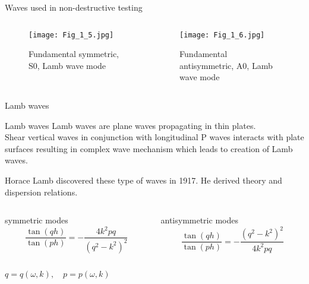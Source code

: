 \documentclass[10pt,aspectratio=169]{beamer} %
\begin{document}
\begin{frame}{Waves used in non-destructive testing}
\begin{columns}[T]
	\begin{column}{0.5\textwidth}
		\begin{figure}
		\texttt{[image: Fig\_1\_5.jpg]}
		\caption{Fundamental symmetric, S0, \alert{Lamb wave} mode }	
		\end{figure}
	\end{column}
	\begin{column}{0.5\textwidth}
		\begin{figure}
		\texttt{[image: Fig\_1\_6.jpg]}
		\caption{Fundamental antisymmetric, A0, \alert{Lamb wave} mode }
		\end{figure}
	\end{column}
\end{columns}	
\end{frame}
\note{
	
}
\begin{frame}{Lamb waves}
\begin{alertblock}{Lamb waves}	
		Lamb waves are plane waves propagating in thin plates.\\
		Shear vertical waves in conjunction with longitudinal P waves interacts with plate surfaces resulting in complex wave mechanism which leads to creation of Lamb waves.
\end{alertblock}
Horace Lamb discovered these type of waves in 1917.
He derived theory and dispersion relations.
\begin{columns}[T]
	\begin{column}{0.5\textwidth}
		\centering
		symmetric modes
		\begin{equation*}
		  \frac{\tan(q h)}{\tan(p h)} = -\frac{4 k^2 p q}{\left(q^2 - k^2\right)^2}
		\end{equation*}
	\end{column}
	\begin{column}{0.5\textwidth}
		\centering
		antisymmetric modes
		\begin{equation*}
		\frac{\tan(q h)}{\tan(p h)} = -\frac{\left(q^2 - k^2\right)^2}{4 k^2 p q}
		\end{equation*}
	\end{column}
\end{columns}
	
\centering
\(q=q(\omega,k), \quad p=p(\omega,k) \)
\end{frame}
\end{document}

